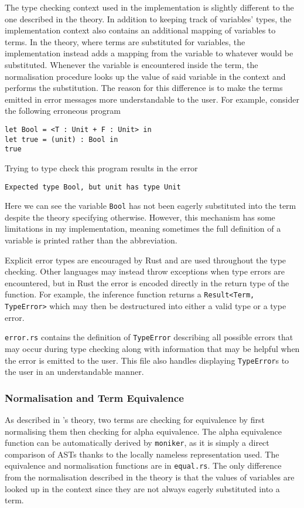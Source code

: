 \documentclass[12pt,a4paper,twoside]{report}
\begin{document}
The type checking context used in the implementation is slightly different to the one described in the theory.
In addition to keeping track of variables' types, the implementation context also contains an additional mapping of variables to terms.
In the theory, where terms are substituted for variables, the implementation instead adds a mapping from the variable to whatever would be substituted.
Whenever the variable is encountered inside the term, the normalisation procedure looks up the value of said variable in the context and performs the substitution.
The reason for this difference is to make the terms emitted in error messages more understandable to the user.
For example, consider the following erroneous program
\begin{lstlisting}
let Bool = <T : Unit + F : Unit> in
let true = (unit) : Bool in
true
\end{lstlisting}
Trying to type check this program results in the error
\begin{lstlisting}
Expected type Bool, but unit has type Unit
\end{lstlisting}
Here we can see the variable \lstinline{Bool} has not been eagerly substituted into the term despite the theory specifying otherwise.
However, this mechanism has some limitations in my implementation, meaning sometimes the full definition of a variable is printed rather than the abbreviation.

Explicit error types are encouraged by Rust and are used throughout the type checking.
Other languages may instead throw exceptions when type errors are encountered, but in Rust the error is encoded directly in the return type of the function.
For example, the inference function returns a \texttt{Result<Term, TypeError>} which may then be destructured into either a valid type or a type error.

\texttt{error.rs} contains the definition of \texttt{TypeError} describing all possible errors that may occur during type checking along with information that may be helpful when the error is emitted to the user.
This file also handles displaying \texttt{TypeError}s to the user in an understandable manner.

\subsubsection{Normalisation and Term Equivalence}

As described in \pimu{}'s theory, two terms are checking for equivalence by first normalising them then checking for alpha equivalence.
The alpha equivalence function can be automatically derived by \texttt{moniker}, as it is simply a direct comparison of ASTs thanks to the locally nameless representation used.
The equivalence and normalisation functions are in \texttt{equal.rs}.
The only difference from the normalisation described in the theory is that the values of variables are looked up in the context since they are not always eagerly substituted into a term.
\end{document}
